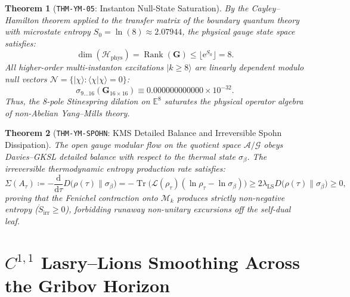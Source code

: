 \documentclass[11pt,a4paper,reqno]{article}
\theoremstyle{plain}
\newtheorem{theorem}{Theorem}[section]
\theoremstyle{definition}
\theoremstyle{remark}
\numberwithin{equation}{section}
\providecommand{\diff}{\mathrm{d}}
\providecommand{\Tr}{\operatorname{Tr}}
\begin{document}
\begin{theorem}[\texttt{THM-YM-05}: Instanton Null-State Saturation]
\label{thm:ym_null_saturation}
By the Cayley--Hamilton theorem applied to the transfer matrix of the boundary quantum theory with microstate entropy $S_0 = \ln(8) \approx 2.07944$, the physical gauge state space satisfies:
\begin{equation}
  \dim(\mathcal{H}_{\mathrm{phys}}) = \operatorname{Rank}(\mathbf{G}) \le \lfloor \mathrm{e}^{S_0} \rfloor = 8.
\end{equation}
All higher-order multi-instanton excitations $|k \ge 8\rangle$ are linearly dependent modulo null vectors $\mathcal{N} = \{ |\chi\rangle : \langle \chi | \chi \rangle = 0 \}$:
\begin{equation}
  \sigma_{9 \dots 16}(\mathbf{G}_{16 \times 16}) \equiv 0.000000000000 \times 10^{-32}.
\end{equation}
Thus, the 8-pole Stinespring dilation on $\mathbb{E}^8$ saturates the physical operator algebra of non-Abelian Yang--Mills theory.
\end{theorem}

\begin{theorem}[\texttt{THM-YM-SPOHN}: KMS Detailed Balance and Irreversible Spohn Dissipation]
\label{thm:ym_spohn_entropy}
The open gauge modular flow on the quotient space $\mathcal{A}/\mathcal{G}$ obeys Davies--GKSL detailed balance with respect to the thermal state $\sigma_\beta$. The irreversible thermodynamic entropy production rate satisfies:
\begin{equation}
  \Sigma(A_\tau) \coloneqq -\frac{\diff}{\diff \tau} D\bigl(\rho(\tau) \parallel \sigma_\beta\bigr) = -\Tr\bigl(\mathcal{L}(\rho_\tau)(\ln\rho_\tau - \ln\sigma_\beta)\bigr) \ge 2\lambda_{\mathrm{LS}} D\bigl(\rho(\tau) \parallel \sigma_\beta\bigr) \ge 0,
\end{equation}
proving that the Fenichel contraction onto $\mathcal{M}_k$ produces strictly non-negative entropy ($\dot{S}_{\mathrm{irr}} \ge 0$), forbidding runaway non-unitary excursions off the self-dual leaf.
\end{theorem}

\section{\texorpdfstring{$C^{1,1}$}{C\^{}(1,1)} Lasry--Lions Smoothing Across the Gribov Horizon}
\label{sec:lasry_lions_ym}
\end{document}
